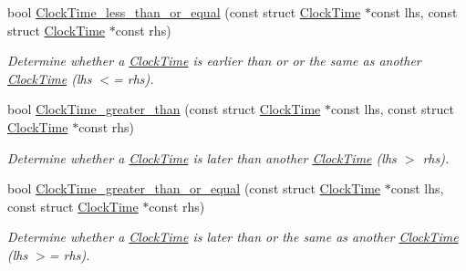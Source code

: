 \begin{DoxyCompactItemize}
bool \hyperlink{clock-time_8h_a161740b6fe1f98b11be56a9769c988ca}{\-Clock\-Time\-\_\-less\-\_\-than\-\_\-or\-\_\-equal} (const struct \hyperlink{structClockTime}{\-Clock\-Time} $\ast$const lhs, const struct \hyperlink{structClockTime}{\-Clock\-Time} $\ast$const rhs)
\begin{DoxyCompactList}\small\item\em \-Determine whether a \hyperlink{structClockTime}{\-Clock\-Time} is earlier than or or the same as another \hyperlink{structClockTime}{\-Clock\-Time} (lhs $<$= rhs). \end{DoxyCompactList}\item 
bool \hyperlink{clock-time_8h_abcaa281176bc5f975aed97b7564bcdb3}{\-Clock\-Time\-\_\-greater\-\_\-than} (const struct \hyperlink{structClockTime}{\-Clock\-Time} $\ast$const lhs, const struct \hyperlink{structClockTime}{\-Clock\-Time} $\ast$const rhs)
\begin{DoxyCompactList}\small\item\em \-Determine whether a \hyperlink{structClockTime}{\-Clock\-Time} is later than another \hyperlink{structClockTime}{\-Clock\-Time} (lhs $>$ rhs). \end{DoxyCompactList}\item 
bool \hyperlink{clock-time_8h_a68e12fd4a679f6060b1fd89dbefbc35d}{\-Clock\-Time\-\_\-greater\-\_\-than\-\_\-or\-\_\-equal} (const struct \hyperlink{structClockTime}{\-Clock\-Time} $\ast$const lhs, const struct \hyperlink{structClockTime}{\-Clock\-Time} $\ast$const rhs)
\begin{DoxyCompactList}\small\item\em \-Determine whether a \hyperlink{structClockTime}{\-Clock\-Time} is later than or the same as another \hyperlink{structClockTime}{\-Clock\-Time} (lhs $>$= rhs). \end{DoxyCompactList}\end{DoxyCompactItemize}


